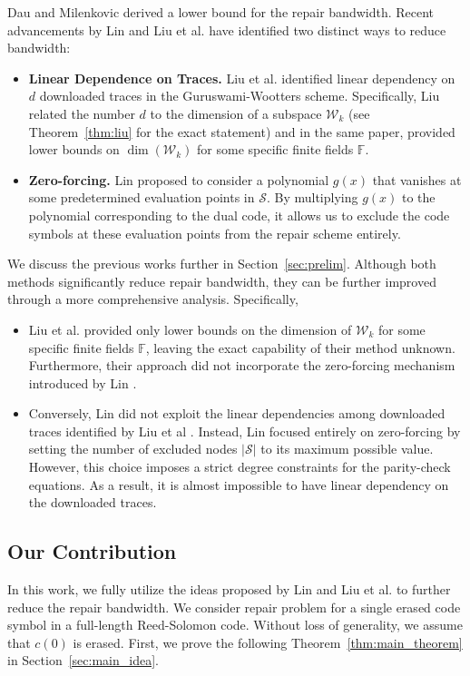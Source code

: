 \documentclass[onecolumn]{IEEEtran}
\theoremstyle{plain}
\theoremstyle{definition}
\newcommand{\FF}{\mathbb{F}}
\newcommand{\cS}{\mathcal{S}}
\newcommand{\cW}{\mathcal{W}}
\begin{document}
Dau and Milenkovic \cite{Dau2017} derived a lower bound for the repair bandwidth. Recent advancements by Lin \cite{Lin2023} and Liu et al. \cite{Liu2024} have identified two distinct ways to reduce bandwidth:
\begin{itemize}[leftmargin=*]
    \item \textbf{Linear Dependence on Traces.} Liu et al. \cite{Liu2024} identified linear dependency on $d$ downloaded traces in the Guruswami-Wootters scheme. Specifically, Liu \cite{Liu2024} related the number $d$ to the dimension of a subspace $\cW_k$ (see Theorem~\ref{thm:liu} for the exact statement) and in the same paper, provided lower bounds on $\dim(\cW_k)$ for some specific finite fields $\FF$.
    \item \textbf{Zero-forcing.} Lin \cite{Lin2023} proposed to consider a polynomial $g(x)$ that vanishes at some predetermined evaluation points in  $\cS$. By multiplying $g(x)$ to the polynomial corresponding to the dual code, it allows us to exclude the code symbols at these evaluation points from the repair scheme entirely.
\end{itemize}
We discuss the previous works further in Section~\ref{sec:prelim}. Although both methods significantly reduce repair bandwidth, they can be further improved through a more comprehensive analysis. Specifically,
\begin{itemize}[leftmargin=*]
    \item Liu et al. \cite{Liu2024} provided only lower bounds on the dimension of $\cW_k$ for some specific finite fields $\FF$, leaving the exact capability of their method unknown. Furthermore, their approach did not incorporate the zero-forcing mechanism introduced by Lin \cite{Lin2023}.
    \item Conversely, Lin \cite{Lin2023} did not exploit the linear dependencies among downloaded traces identified by Liu et al \cite{Liu2024}. Instead, Lin focused entirely on zero-forcing by setting the number of excluded nodes $|\cS|$ to its maximum possible value. However, this choice imposes a strict degree constraints for the parity-check equations. As a result, it is almost impossible to have linear dependency on the downloaded traces.
\end{itemize}


\subsection{Our Contribution}
In this work, we fully utilize the ideas proposed by Lin \cite{Lin2023} and Liu et al. \cite{Liu2024} to further reduce the repair bandwidth. We consider repair problem for a single erased code symbol in a full-length Reed-Solomon code. Without loss of generality, we assume that $c(0)$ is erased. First, we prove the following Theorem~\ref{thm:main_theorem} in Section~\ref{sec:main_idea}.
\end{document}
